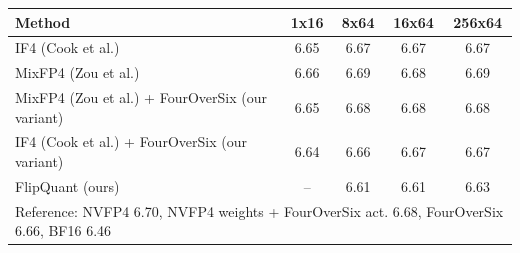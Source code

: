 \begin{tabular}{lcccc}
\toprule
Method & 1x16 & 8x64 & 16x64 & 256x64 \\
\midrule
IF4 (Cook et al.) & 6.65 & 6.67 & 6.67 & 6.67 \\
MixFP4 (Zou et al.) & 6.66 & 6.69 & 6.68 & 6.69 \\
MixFP4 (Zou et al.) + FourOverSix (our variant) & 6.65 & 6.68 & 6.68 & 6.68 \\
IF4 (Cook et al.) + FourOverSix (our variant) & 6.64 & 6.66 & 6.67 & 6.67 \\
FlipQuant (ours) & -- & 6.61 & 6.61 & 6.63 \\
\midrule
\multicolumn{5}{l}{\footnotesize Reference: NVFP4 6.70, NVFP4 weights + FourOverSix act. 6.68, FourOverSix 6.66, BF16 6.46} \\
\bottomrule
\end{tabular}
